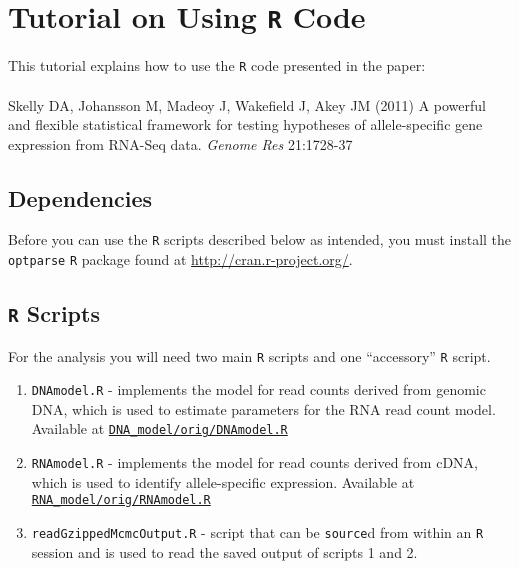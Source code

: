 \documentclass[12pt,]{article}
\begin{document}
\section{Tutorial on Using {\tt R} Code}
This tutorial explains how to use the {\tt R} code presented in the paper: \\ \\
Skelly DA, Johansson M, Madeoy J, Wakefield J, Akey JM (2011) A powerful 
and flexible statistical framework for testing hypotheses of allele-specific gene 
expression from RNA-Seq data. \emph{Genome Res} 21:1728-37\\

\subsection{Dependencies}
Before you can use the {\tt R} scripts described below as intended, you must
install the {\tt optparse} {\tt R} package found at \url{http://cran.r-project.org/}.

\subsection{{\tt R} Scripts}
For the analysis you will need two main {\tt R} scripts and one ``accessory'' 
{\tt R} script.
\begin{enumerate}
\item {\tt DNAmodel.R} - implements the model for read counts derived from 
genomic DNA, which is used to estimate parameters for the RNA read count model.
Available at \href{https://github.com/daskelly/ase/DNA\_model/orig/DNAmodel.R}{\nolinkurl{DNA\_model/orig/DNAmodel.R}}
\item {\tt RNAmodel.R} - implements the model for read counts derived from
cDNA, which is used to identify allele-specific expression.
Available at \href{https://github.com/daskelly/ase/RNA\_model/orig/RNAmodel.R}{\nolinkurl{RNA\_model/orig/RNAmodel.R}}
\item {\tt readGzippedMcmcOutput.R} - script that can be {\tt source}d 
from within an {\tt R} session and is used to read the saved output of 
scripts 1 and 2. 
\end{enumerate}
\end{document}
